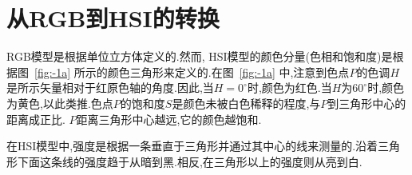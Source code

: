 \section{从RGB到HSI的转换}

RGB模型是根据单位立方体定义的.然而, HSI模型的颜色分量(色相和饱和度)是根据图~\ref{fig:-1a} 所示的颜色三角形来定义的.在图~\ref{fig:-1a} 中,注意到色点$P$的色调$H$是所示矢量相对于红原色轴的角度.因此,当$H=0^{\circ}$时,颜色为红色.当$H$为$60^{\circ}$时,颜色为黄色,以此类推.色点$P$的饱和度$S$是颜色未被白色稀释的程度,与$P$到三角形中心的距离成正比. $P$距离三角形中心越远,它的颜色越饱和.

在HSI模型中,强度是根据一条垂直于三角形并通过其中心的线来测量的.沿着三角形下面这条线的强度趋于从暗到黑.相反,在三角形以上的强度则从亮到白.



